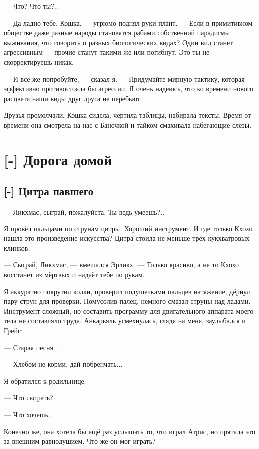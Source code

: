 --- Что?
Что ты?..

--- Да ладно тебе, Кошка, --- угрюмо поднял руки плант.
--- Если в примитивном обществе даже разные народы становятся рабами собственной парадигмы выживания, что говорить о разных биологических видах?
Один вид станет агрессивным --- прочие станут такими же или погибнут.
Это ты не скорректируешь никак.

--- И всё же попробуйте, --- сказал я.
--- Придумайте мирную тактику, которая эффективно противостояла бы агрессии.
Я очень надеюсь, что ко времени нового расцвета наши виды друг друга не перебьют.

Друзья промолчали.
Кошка сидела, чертила таблицы, набирала тексты.
Время от времени она смотрела на нас с Баночкой и тайком смахивала набегающие слёзы.

\chapter{[-] Дорога домой}

\section{[-] Цитра павшего}

\textspace

--- Ликхмас, сыграй, пожалуйста.
Ты ведь умеешь?..

Я провёл пальцами по струнам цитры.
Хороший инструмент.
И где только Кхохо нашла это произведение искусства?
Цитра стоила не меньше трёх кукхватровых клинков.

--- Сыграй, Ликхмас, --- вмешался Эрликх.
--- Только красиво, а не то Кхохо восстанет из мёртвых и надаёт тебе по рукам.

Я аккуратно покрутил колки, проверил подушечками пальцев натяжение, дёрнул пару струн для проверки.
Помусолив палец, немного смазал струны над ладами.
Инструмент сложный, но составить программу для двигательного аппарата моего тела не составляло труда.
Анкарьяль усмехнулась, глядя на меня, заулыбался и Грейс:

--- Старая песня...

--- Хлебом не корми, дай побренчать...

Я обратился к родильнице:

--- Что сыграть?

--- Что хочешь.

Конечно же, она хотела бы ещё раз услышать то, что играл Атрис, но прятала это за внешним равнодушием.
Что же он мог играть?

